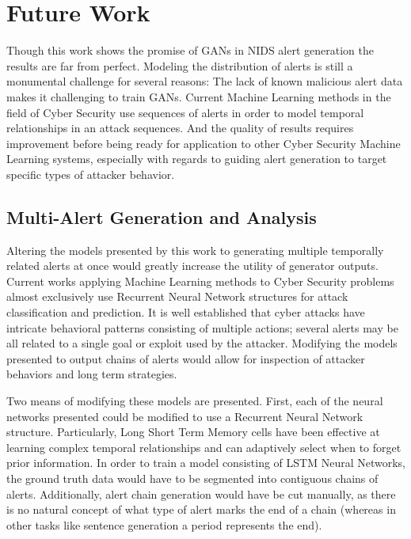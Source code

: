 \section{Future Work}

Though this work shows the promise of GANs in NIDS alert generation the results are far from perfect. Modeling the distribution of alerts is still a monumental challenge for several reasons: The lack of known malicious alert data makes it challenging to train GANs. Current Machine Learning methods in the field of Cyber Security use sequences of alerts in order to model temporal relationships in an attack sequences. And the quality of results requires improvement before being ready for application to other Cyber Security Machine Learning systems, especially with regards to guiding alert generation to target specific types of attacker behavior. 

\subsection{Multi-Alert Generation and Analysis}

Altering the models presented by this work to generating multiple temporally related alerts at once would greatly increase the utility of generator outputs. Current works applying Machine Learning methods to Cyber Security problems almost exclusively use Recurrent Neural Network structures for attack classification and prediction. It is well established that cyber attacks have intricate behavioral patterns consisting of multiple actions; several alerts may be all related to a single goal or exploit used by the attacker. Modifying the models presented to output chains of alerts would allow for inspection of attacker behaviors and long term strategies. 

Two means of modifying these models are presented. First, each of the neural networks presented could be modified to use a Recurrent Neural Network structure. Particularly, Long Short Term Memory cells have been effective at learning complex temporal relationships and can adaptively select when to forget prior information. In order to train a model consisting of LSTM Neural Networks, the ground truth data would have to be segmented into contiguous chains of alerts. Additionally, alert chain generation would have be cut manually, as there is no natural concept of what type of alert marks the end of a chain (whereas in other tasks like sentence generation a period represents the end). 

